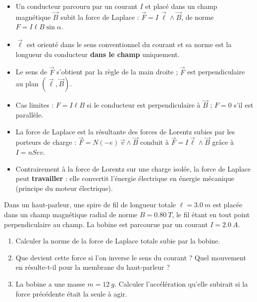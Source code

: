 \documentclass[11pt]{article}
\begin{document}
\begin{aretenir}
\begin{itemize}
\item Un conducteur parcouru par un courant $I$ et placé dans un champ magnétique $\vec{B}$ subit la force de Laplace : $\vec{F} = I\,\vec{\ell}\wedge\vec{B}$, de norme $F = I\ell B\sin\alpha$.
\item $\vec{\ell}$ est orienté dans le sens conventionnel du courant et sa norme est la longueur du conducteur \textbf{dans le champ} uniquement.
\item Le sens de $\vec{F}$ s'obtient par la règle de la main droite ; $\vec{F}$ est perpendiculaire au plan $(\vec{\ell}, \vec{B})$.
\item Cas limites : $F = I\ell B$ si le conducteur est perpendiculaire à $\vec{B}$ ; $F = 0$ s'il est parallèle.
\item La force de Laplace est la résultante des forces de Lorentz subies par les porteurs de charge : $\vec{F} = N(-e)\,\vec{v}\wedge\vec{B}$ conduit à $\vec{F} = I\vec{\ell}\wedge\vec{B}$ grâce à $I = nSev$.
\item Contrairement à la force de Lorentz sur une charge isolée, la force de Laplace peut \textbf{travailler} : elle convertit l'énergie électrique en énergie mécanique (principe du moteur électrique).
\end{itemize}
\end{aretenir}

\begin{exercice}
Dans un haut-parleur, une spire de fil de longueur totale $\ell = \SI{3,0}{m}$ est placée dans un champ magnétique radial de norme $B = \SI{0,80}{T}$, le fil étant en tout point perpendiculaire au champ. La bobine est parcourue par un courant $I = \SI{2,0}{A}$.
\begin{enumerate}
\item Calculer la norme de la force de Laplace totale subie par la bobine.
\item Que devient cette force si l'on inverse le sens du courant ? Quel mouvement en résulte-t-il pour la membrane du haut-parleur ?
\item La bobine a une masse $m = \SI{12}{g}$. Calculer l'accélération qu'elle subirait si la force précédente était la seule à agir.
\end{enumerate}
\end{exercice}
\end{document}
